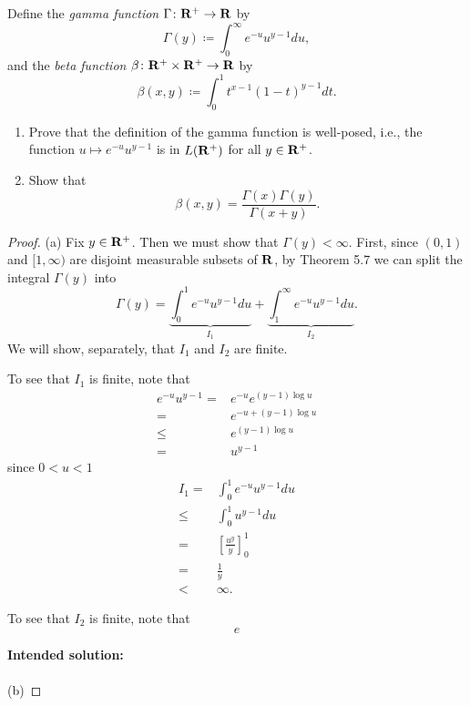 \begin{problem}
Define the \emph{gamma function} $\Gamma\colon\mathbf{R}^+\to\mathbf{R}$ by
\[
\Gamma(y)\coloneqq\int_0^\infty e^{-u}u^{y-1} d  u,
\]
and the \emph{beta function} $\beta\colon\mathbf{R}^+\times\mathbf{R}^+\to\mathbf{R}$
by
\[
\beta(x,y)\coloneqq\int_0^1 t^{x-1}(1-t)^{y-1} d  t.
\]
\begin{enumerate}[label=(\alph*)]
\item Prove that the definition of the gamma function is well-posed, i.e.,
the function $u\mapsto e^{-u}u^{y-1}$ is in $L(\mathbf{R}^+)$ for all
$y\in\mathbf{R}^+$.
\item Show that
\[
\beta(x,y)=\frac{\Gamma(x)\Gamma(y)}{\Gamma(x+y)}.
\]
\end{enumerate}
\end{problem}
\begin{proof}
(a) Fix $y\in\mathbf{R}^+$. Then we must show that $\Gamma(y)<\infty$. First,
since $(0,1)$ and $[1,\infty)$ are disjoint measurable subsets of $\mathbf{R}$,
by Theorem 5.7 we can split the integral $\Gamma(y)$ into
\begin{equation}
\label{eq:split-integral-5}
\Gamma(y)=\underbrace{\int_0^1 e^{-u}u^{y-1} d  u}_{I_1}
+\underbrace{\int_1^\infty e^{-u}u^{y-1} d  u}_{I_2}.
\end{equation}
We will show, separately, that $I_1$ and $I_2$ are finite.

To see that $I_1$ is finite, note that
\begin{equation}
\label{eq:estimate-1-5}
\begin{aligned}
e^{-u}u^{y-1}={}&e^{-u}e^{(y-1)\log u}\\
={}&e^{-u+(y-1)\log u}\\
\leq{}&e^{(y-1)\log u}\\
={}&u^{y-1}
\end{aligned}
\end{equation}
since $0<u<1$
\begin{equation}
\label{eq:estimate-i-1-5}
\begin{aligned}
I_1={}&\int_0^1 e^{-u}u^{y-1} d  u\\
\leq{}&\int_0^1 u^{y-1} d  u\\
={}&\left[\frac{u^y}{y}\right]_0^1\\
={}&\frac{1}{y}\\
<{}&\infty.
\end{aligned}
\end{equation}

To see that $I_2$ is finite, note that
\begin{equation}
\label{eq:estimate-2-5}
e
\end{equation}

\textbf{Intended solution:}
\\\\
(b)
\end{proof}

